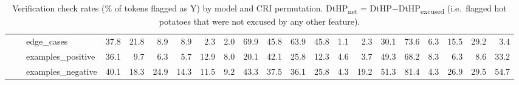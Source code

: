 \begin{table}[p]
\begin{adjustbox}{max width=\linewidth}
\begin{tabular}{lll rrrrrrrrrrrrrrrrrr}
 &  & edge\_cases & 37.8 & 21.8 & 8.9 & 8.9 & 2.3 & 2.0 & 69.9 & 45.8 & 63.9 & 45.8 & 1.1 & 2.3 & 30.1 & 73.6 & 6.3 & 15.5 & 29.2 & 3.4 \\
 &  & examples\_positive & 36.1 & 9.7 & 6.3 & 5.7 & 12.9 & 8.0 & 20.1 & 42.1 & 25.8 & 12.3 & 4.6 & 3.7 & 49.3 & 68.2 & 8.3 & 6.3 & 8.6 & 33.2 \\
 &  & examples\_negative & 40.1 & 18.3 & 24.9 & 14.3 & 11.5 & 9.2 & 43.3 & 37.5 & 36.1 & 25.8 & 4.3 & 19.2 & 51.3 & 81.4 & 4.3 & 26.9 & 29.5 & 54.7 \\
\bottomrule
\end{tabular}
\end{adjustbox}
\caption{Verification check rates (\% of tokens flagged as Y) by model and CRI permutation. DtHP\textsubscript{net} = DtHP$-$DtHP\textsubscript{excused} (i.e.\ flagged hot potatoes that were not excused by any other feature).}
\label{tab:verification}
\end{table}
